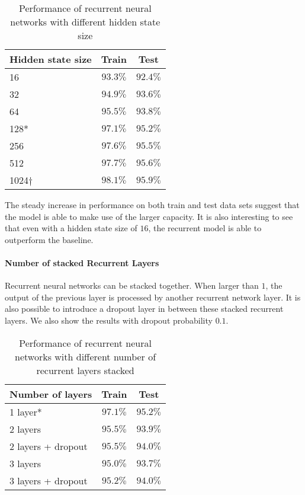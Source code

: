 \documentclass[11pt,a4paper]{article}
\newcommand{\dagg}{$\dagger{}$}
\begin{document}
\begin{table}[ht]
    \centering
    \begin{tabular}{lcc}
    \toprule
    Hidden state size & Train & Test \\
    \midrule
    16 &   $93.3\%$ & $92.4\%$ \\
    32 &   $94.9\%$ & $93.6\%$ \\
    64 &   $95.5\%$ & $93.8\%$ \\
    128* & $97.1\%$ & $95.2\%$ \\
    256 &  $97.6\%$ & $95.5\%$ \\
    512 &  $97.7\%$ & $95.6\%$ \\
    1024\dagg & $98.1\%$ & $95.9\%$ \\
    \bottomrule
    \end{tabular}
    \caption{\label{tab:hidden_size} Performance of recurrent neural networks with different hidden state size}
\end{table}

The steady increase in performance on both train and test data sets suggest that the model is able to make use of the larger capacity. It is also interesting to see that even with a hidden state size of $16$, the recurrent model is able to outperform the baseline.

\paragraph{Number of stacked Recurrent Layers}

Recurrent neural networks can be stacked together. When larger than $1$, the output of the previous layer is processed by another recurrent network layer. It is also possible to introduce a dropout layer in between these stacked recurrent layers. We also show the results with dropout probability $0.1$.

\begin{table}[ht]
    \centering
    \begin{tabular}{lcc}
    \toprule
    Number of layers & Train & Test \\
    \midrule
    1 layer*\dag{} & $97.1\%$ & $95.2\%$ \\
    2 layers & $95.5\%$ & $93.9\%$ \\
    2 layers + dropout & $95.5\%$ & $94.0\%$ \\
    3 layers & $95.0\%$ & $93.7\%$ \\
    3 layers + dropout & $95.2\%$ & $94.0\%$ \\
    \bottomrule
    \end{tabular}
    \caption{\label{tab:rnn_layers} Performance of recurrent neural networks with different number of recurrent layers stacked}
\end{table}
\end{document}
